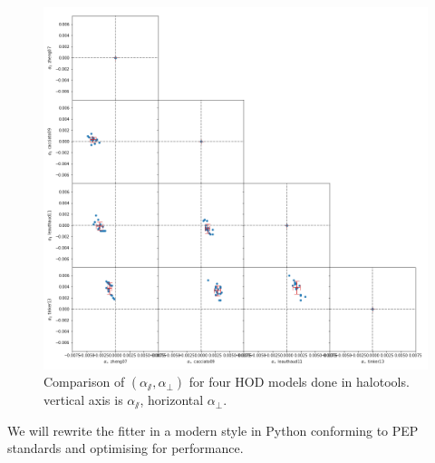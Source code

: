 \documentclass[fleqn,usenatbib]{mnras}
\begin{document}
	\begin{figure}
		\includegraphics[width=\linewidth]{alpha_pair_compare.png}
	    \caption{Comparison of $ (\alpha_\varparallel, \alpha_\perp) $ for four HOD models done in halotools. vertical axis is $\alpha_\varparallel$, horizontal $\alpha_\perp$. }
	    \label{fig:alpha_hod_compare}
	\end{figure}
	
	We will rewrite the fitter in a modern style in Python conforming to PEP standards and optimising for performance.
	
\end{document}

